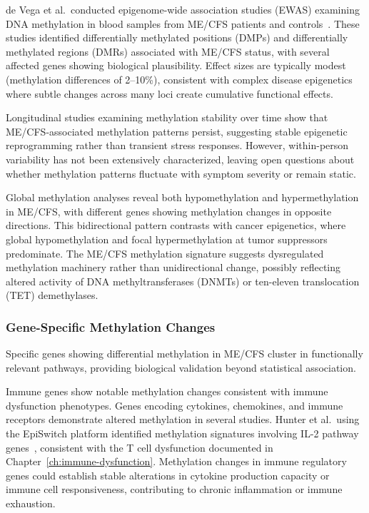\begin{observation}
de Vega et al.\ conducted epigenome-wide association studies (EWAS) examining DNA methylation in blood samples from ME/CFS patients and controls~\cite{deVega2018}. These studies identified differentially methylated positions (DMPs) and differentially methylated regions (DMRs) associated with ME/CFS status, with several affected genes showing biological plausibility. Effect sizes are typically modest (methylation differences of 2--10\%), consistent with complex disease epigenetics where subtle changes across many loci create cumulative functional effects.

Longitudinal studies examining methylation stability over time show that ME/CFS-associated methylation patterns persist, suggesting stable epigenetic reprogramming rather than transient stress responses. However, within-person variability has not been extensively characterized, leaving open questions about whether methylation patterns fluctuate with symptom severity or remain static.
\end{observation}

Global methylation analyses reveal both hypomethylation and hypermethylation in ME/CFS, with different genes showing methylation changes in opposite directions. This bidirectional pattern contrasts with cancer epigenetics, where global hypomethylation and focal hypermethylation at tumor suppressors predominate. The ME/CFS methylation signature suggests dysregulated methylation machinery rather than unidirectional change, possibly reflecting altered activity of DNA methyltransferases (DNMTs) or ten-eleven translocation (TET) demethylases.

\subsubsection{Gene-Specific Methylation Changes}

Specific genes showing differential methylation in ME/CFS cluster in functionally relevant pathways, providing biological validation beyond statistical association.

Immune genes show notable methylation changes consistent with immune dysfunction phenotypes. Genes encoding cytokines, chemokines, and immune receptors demonstrate altered methylation in several studies. Hunter et al.\ using the EpiSwitch platform identified methylation signatures involving IL-2 pathway genes~\cite{Hunter2025}, consistent with the T cell dysfunction documented in Chapter~\ref{ch:immune-dysfunction}. Methylation changes in immune regulatory genes could establish stable alterations in cytokine production capacity or immune cell responsiveness, contributing to chronic inflammation or immune exhaustion.

